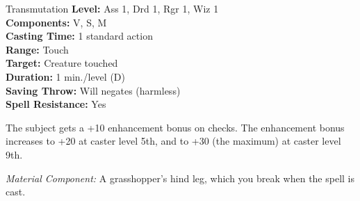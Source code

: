 {Transmutation}
{
	\textbf{Level:}
	Ass 1, Drd 1, Rgr 1, Wiz 1\\
	\textbf{Components:}
	V, S, M\\
	\textbf{Casting Time:}
	1 standard action\\
	\textbf{Range:}
	Touch\\
	\textbf{Target:}
	Creature touched\\
	\textbf{Duration:}
	1 min./level (D)\\
	\textbf{Saving Throw:}
	Will negates (harmless)\\
	\textbf{Spell Resistance:}
	Yes\\
}
{
	The subject gets a +10 enhancement bonus on  checks. The enhancement bonus increases to +20 at caster level 5th, and to +30 (the maximum) at caster level 9th.

	\textit{Material Component:}
	A grasshopper's hind leg, which you break when the spell is cast.

}
